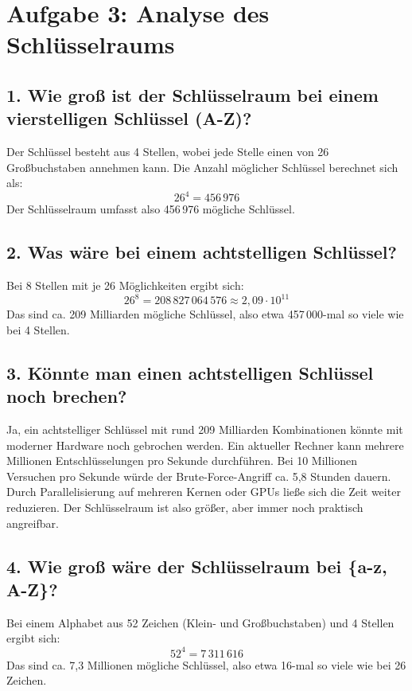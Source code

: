 \documentclass[
	fontsize=12pt,          %
	paper=a4,               %
	numbers=noenddot,       %
	listof=totoc,           %
	listof=entryprefix,     %
	listof=nochaptergap,    %
	bibliography=totoc,     %
	parskip=half,           %
	openany                 %
]{scrbook}
\begin{document}
\chapter*{Aufgabe 3: Analyse des Schlüsselraums}

\section*{1. Wie groß ist der Schlüsselraum bei einem vierstelligen Schlüssel (A-Z)?}

Der Schlüssel besteht aus 4 Stellen, wobei jede Stelle einen von 26 Großbuchstaben annehmen kann.
Die Anzahl möglicher Schlüssel berechnet sich als:
\[
26^4 = 456\,976
\]
Der Schlüsselraum umfasst also 456\,976 mögliche Schlüssel.

\section*{2. Was wäre bei einem achtstelligen Schlüssel?}

Bei 8 Stellen mit je 26 Möglichkeiten ergibt sich:
\[
26^8 = 208\,827\,064\,576 \approx 2{,}09 \cdot 10^{11}
\]
Das sind ca. 209 Milliarden mögliche Schlüssel, also etwa 457\,000-mal so viele wie bei 4 Stellen.

\section*{3. Könnte man einen achtstelligen Schlüssel noch brechen?}

Ja, ein achtstelliger Schlüssel mit rund 209 Milliarden Kombinationen könnte mit moderner Hardware noch gebrochen werden.
Ein aktueller Rechner kann mehrere Millionen Entschlüsselungen pro Sekunde durchführen.
Bei 10 Millionen Versuchen pro Sekunde würde der Brute-Force-Angriff ca. 5,8 Stunden dauern.
Durch Parallelisierung auf mehreren Kernen oder GPUs ließe sich die Zeit weiter reduzieren.
Der Schlüsselraum ist also größer, aber immer noch praktisch angreifbar.

\section*{4. Wie groß wäre der Schlüsselraum bei \{a-z, A-Z\}?}

Bei einem Alphabet aus 52 Zeichen (Klein- und Großbuchstaben) und 4 Stellen ergibt sich:
\[
52^4 = 7\,311\,616
\]
Das sind ca. 7,3 Millionen mögliche Schlüssel, also etwa 16-mal so viele wie bei 26 Zeichen.
\end{document}
